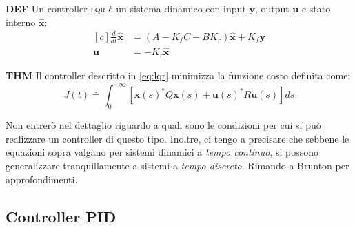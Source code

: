 \begin{framed}
  \textbf{DEF}
  Un controller \textsc{lqr} è un sistema dinamico con input $\mathbf y$, output $\mathbf u$ e stato interno
  $\hat{\mathbf x}$: %
  \begin{equation}
    \begin{aligned}[c]
      \frac d {dt} \hat {\mathbf x} &= (A-K_f C - B K_r) \hat{\mathbf x} + K_f \mathbf y \\ %
      \mathbf u               &= -K_r \hat{\mathbf x}
    \end{aligned}
    \label{eq:lqr}
  \end{equation}
\end{framed}
\begin{framed}
  \textbf{THM}
  Il controller descritto in \eqref{eq:lqr} minimizza la funzione costo definita come:
  \begin{equation}
    J(t) \doteq
      \int_0^{+\infty} \left[ \mathbf{x} (s)^* Q \mathbf {x} (s) + \mathbf {u} (s)^* R \mathbf {u} (s) \right] ds
    \label{eq:lqr-costo}
  \end{equation}
\end{framed}

Non entrerò nel dettaglio riguardo a quali sono le condizioni per cui si può realizzare un controller di questo tipo.
Inoltre, ci tengo a precisare che sebbene le equazioni sopra %
valgano per sistemi dinamici a \emph{tempo continuo}, si possono generalizzare tranquillamente a sistemi
a \emph{tempo discreto}.
Rimando a Brunton\cite{brunton2019data} per approfondimenti.

\subsection{Controller \textsc{PID}}\label{subsec:intro-pid}
